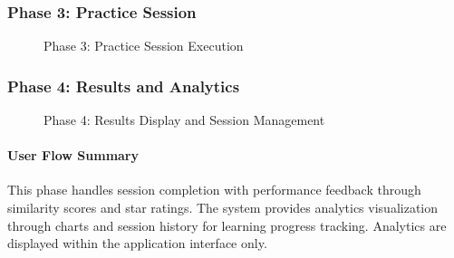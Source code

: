 \clearpage
\subsubsection{Phase 3: Practice Session}

\begin{figure}[H]
\centering
{}
\caption{Phase 3: Practice Session Execution}
\label{fig:phase3_session_corrected}
\end{figure}

\clearpage
\subsubsection{Phase 4: Results and Analytics}

\begin{figure}[H]
\centering
{}
\caption{Phase 4: Results Display and Session Management}
\label{fig:phase4_results_corrected}
\end{figure}

\clearpage

\paragraph{User Flow Summary}
This phase handles session completion with performance feedback through similarity scores and star ratings. The system provides analytics visualization through charts and session history for learning progress tracking. Analytics are displayed within the application interface only.